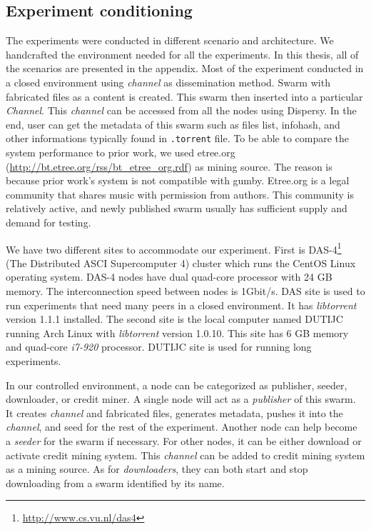 \subsection{Experiment conditioning}
The experiments were conducted in different scenario and architecture. We handcrafted the environment needed for all the experiments. In this thesis, all of the scenarios are presented in the appendix. Most of the experiment conducted in a closed environment using \textit{channel} as dissemination method. Swarm with fabricated files as a content is created. This swarm then inserted into a particular \textit{Channel}. This \textit{channel} can be accessed from all the nodes using Dispersy. In the end, user can get the metadata of this swarm such as files list, infohash, and other informations typically found in \texttt{.torrent} file. To be able to compare the system performance to prior work, we used etree.org (\url{http://bt.etree.org/rss/bt_etree_org.rdf}) as mining source. The reason is because prior work's system is not compatible with gumby. Etree.org is a legal community that shares music with permission from authors. This community is relatively active, and newly published swarm usually has sufficient supply and demand for testing. 

We have two different sites to accommodate our experiment. First is DAS-4\footnote{\url{http://www.cs.vu.nl/das4}} (The Distributed ASCI Supercomputer 4) cluster which runs the CentOS Linux operating system. DAS-4 nodes have dual quad-core processor with 24 GB memory. The interconnection speed between nodes is 1Gbit/s. DAS site is used to run experiments that need many peers in a closed environment. It has \textit{libtorrent} version 1.1.1 installed. The second site is the local computer named DUTIJC running Arch Linux with \textit{libtorrent} version 1.0.10. This site has 6 GB memory and quad-core \textit{i7-920} processor. DUTIJC site is used for running long experiments. 

In our controlled environment, a node can be categorized as publisher, seeder, downloader, or credit miner. A single node will act as a \textit{publisher} of this swarm. It creates \textit{channel} and fabricated files, generates metadata, pushes it into the \textit{channel}, and seed for the rest of the experiment. Another node can help become a \textit{seeder} for the swarm if necessary. For other nodes, it can be either download or activate credit mining system. This \textit{channel} can be added to credit mining system as a mining source. As for \textit{downloaders}, they can both start and stop downloading from a swarm identified by its name. 

